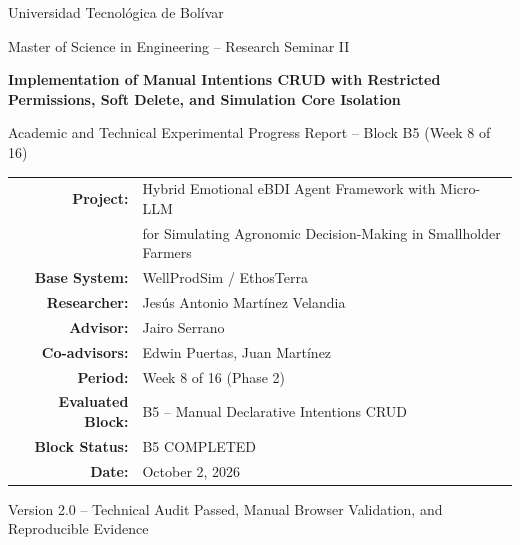 \documentclass[11pt,a4paper]{article}
\begin{document}
\begin{titlepage}
    \centering
    \vspace*{1.2cm}

    {\large Universidad Tecnológica de Bolívar\par}
    \vspace{0.3cm}
    {\normalsize Master of Science in Engineering -- Research Seminar II\par}

    \vspace{2.0cm}
    {\LARGE\bfseries Implementation of Manual Intentions CRUD with Restricted Permissions, Soft Delete, and Simulation Core Isolation\par}
    \vspace{0.5cm}
    {\large Academic and Technical Experimental Progress Report -- Block B5 (Week 8 of 16)\par}

    \vspace{2.0cm}
    \begin{tabular}{rl}
        \textbf{Project:} & Hybrid Emotional eBDI Agent Framework with Micro-LLM \\
                           & for Simulating Agronomic Decision-Making in Smallholder Farmers \\
        \textbf{Base System:} & WellProdSim / EthosTerra \\
        \textbf{Researcher:} & Jesús Antonio Martínez Velandia \\
        \textbf{Advisor:} & Jairo Serrano \\
        \textbf{Co-advisors:} & Edwin Puertas, Juan Martínez \\
        \textbf{Period:} & Week 8 of 16 (Phase 2) \\
        \textbf{Evaluated Block:} & B5 -- Manual Declarative Intentions CRUD \\
        \textbf{Block Status:} & B5 COMPLETED \\
        \textbf{Date:} & October 2, 2026 \\
    \end{tabular}

    \vfill
    {\small Version 2.0 -- Technical Audit Passed, Manual Browser Validation, and Reproducible Evidence\par}
    \vspace*{0.8cm}
\end{titlepage}
\end{document}
